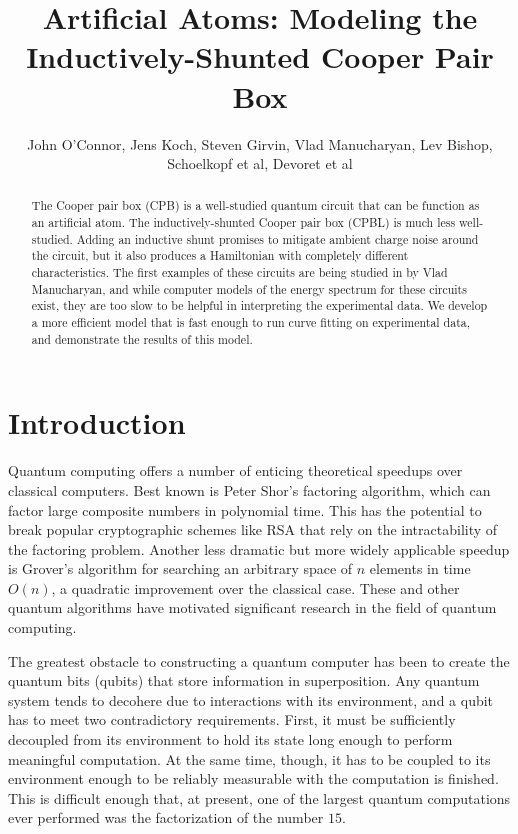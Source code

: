\documentclass[twocolumn]{revtex4}
\begin{document}
\title{Artificial Atoms: Modeling the Inductively-Shunted Cooper Pair
  Box}
\author{John O'Connor, Jens Koch, Steven Girvin, Vlad Manucharyan, Lev
  Bishop, Schoelkopf et al, Devoret et al}

\begin{abstract}
  The Cooper pair box (CPB) is a well-studied quantum circuit that can be
  function as an artificial atom. The inductively-shunted Cooper pair
  box (CPBL) is much less well-studied. Adding an inductive shunt
  promises to mitigate ambient charge noise around the circuit, but it
  also produces a Hamiltonian with completely different
  characteristics. The first examples of these circuits are being
  studied in by Vlad Manucharyan, and while computer models of the
  energy spectrum for these circuits exist, they are too slow to be
  helpful in interpreting the experimental data. We develop a more
  efficient model that is fast enough to run curve fitting on
  experimental data, and demonstrate the results of this model.
\end{abstract}

\maketitle

\section{Introduction}

Quantum computing offers a number of enticing theoretical speedups
over classical computers. Best known is Peter Shor's factoring
algorithm, which can factor large composite numbers in polynomial
time. This has the potential to break popular cryptographic schemes
like RSA that rely on the intractability of the factoring
problem. Another less dramatic but more widely applicable speedup is
Grover's algorithm for searching an arbitrary space of $n$ elements in
time $O(n)$, a quadratic improvement over the classical case. These
and other quantum algorithms have motivated significant research in
the field of quantum computing.

The greatest obstacle to constructing a quantum computer has been to
create the quantum bits (qubits) that store information in
superposition. Any quantum system tends to decohere due to
interactions with its environment, and a qubit has to meet two
contradictory requirements. First, it must be sufficiently decoupled
from its environment to hold its state long enough to perform
meaningful computation. At the same time, though, it has to be coupled
to its environment enough to be reliably measurable with the
computation is finished. This is difficult enough that, at present,
one of the largest quantum computations ever performed
\cite{Vandersypen} was the factorization of the number $15$.
\end{document}
